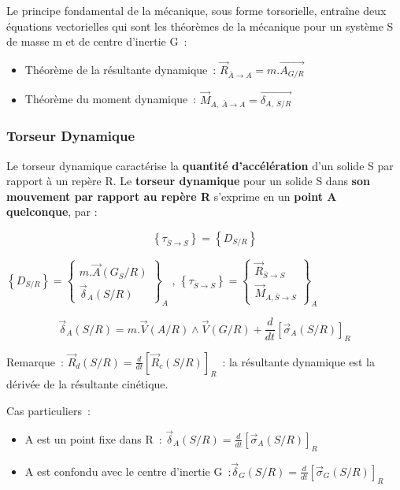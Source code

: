 Le principe fondamental de la mécanique, sous forme torsorielle, entraîne deux équations vectorielles qui sont les théorèmes de la mécanique pour un système S de masse m et de centre d'inertie G~:

\begin{itemize}
\item
  Théorème de la résultante dynamique~: \({\overrightarrow{R}}_{\overline{A} \rightarrow A} = m.\overrightarrow{A_{G/R}}\)
\item
  Théorème du moment dynamique~: \({\overrightarrow{M}}_{A,\ \overline{A} \rightarrow A} = \overrightarrow{\delta_{A,\ S/R}}\)
\end{itemize}

\hypertarget{torseur-dynamique}{%
\subsubsection{Torseur Dynamique}\label{torseur-dynamique}}

Le torseur dynamique caractérise la \textbf{quantité} \textbf{d'accélération} d'un solide S par rapport à un repère R. Le \textbf{torseur dynamique} pour un solide S dans \textbf{son mouvement par rapport au repère R} s'exprime en un \textbf{point A quelconque}, par :

\[\left\{ \tau_{\overline{S} \rightarrow S} \right\} = \left\{ D_{S/R} \right\}\]

\(\left\{ D_{S/R} \right\} = \begin{Bmatrix} m.\overrightarrow{A}(G_{S}/R) \\ {\overrightarrow{\delta}}_{A}(S/R) \end{Bmatrix}_{A}\) , \(\left\{ \tau_{\overline{S} \rightarrow S} \right\} = \begin{Bmatrix} {\overrightarrow{R}}_{\overline{S} \rightarrow S} \\ {\overrightarrow{M}}_{A,\overline{S} \rightarrow S} \end{Bmatrix}_{A}\)

\[{\overrightarrow{\delta}}_{A}(S/R) = m.\overrightarrow{V}(A/R) \land \overrightarrow{V}(G/R) + \frac{d}{dt}\left\lbrack {\overrightarrow{\sigma}}_{A}(S/R) \right\rbrack_{R}\]

Remarque~: \({\overrightarrow{R}}_{d}(S/R) = \frac{d}{dt}\left\lbrack {\overrightarrow{R}}_{c}(S/R) \right\rbrack_{R}\)~: la résultante dynamique est la dérivée de la résultante cinétique.

Cas particuliers~:

\begin{itemize}
\item
  A est un point fixe dans R~: \({\overrightarrow{\delta}}_{A}(S/R) = \frac{d}{dt}\left\lbrack {\overrightarrow{\sigma}}_{A}(S/R) \right\rbrack_{R}\)
\item
  A est confondu avec le centre d'inertie G~:\({\overrightarrow{\delta}}_{G}(S/R) = \frac{d}{dt}\left\lbrack {\overrightarrow{\sigma}}_{G}(S/R) \right\rbrack_{R}\)
\end{itemize}

